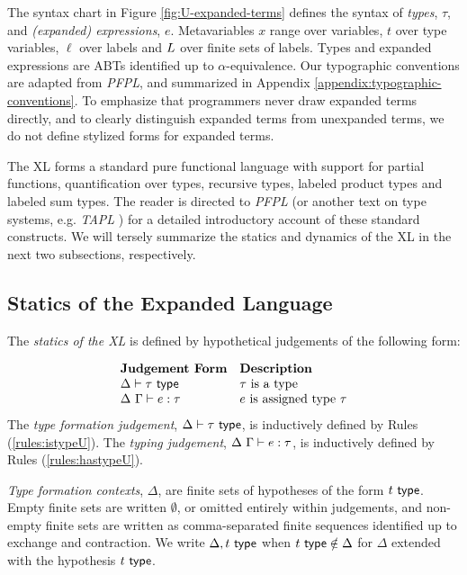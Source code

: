 \noindent The syntax chart in Figure \ref{fig:U-expanded-terms} defines the syntax of \emph{types}, $\tau$, and \emph{(expanded) expressions}, $e$. Metavariables $x$ range over variables, $t$ over type variables, $\ell$ over labels and $L$ over finite sets of labels. Types and expanded expressions are ABTs identified up to $\alpha$-equivalence. Our typographic conventions are adapted from \emph{PFPL}, and summarized in Appendix \ref{appendix:typographic-conventions}. To emphasize that programmers never draw expanded terms directly, and to clearly distinguish expanded terms from unexpanded terms, we do not define stylized forms for expanded terms.

The {XL} forms a standard pure functional language with support for partial functions, quantification over types, recursive types, labeled product types and labeled sum types.  The reader is directed to \emph{PFPL} \cite{pfpl} (or another text on type systems, e.g. \emph{TAPL} \cite{tapl}) for a detailed introductory account of these standard constructs. We will tersely summarize the statics and dynamics of the XL in the next two subsections, respectively.


\subsection{Statics of the Expanded Language}
The \emph{statics of the XL} is defined by hypothetical judgements of the following form:

\[\begin{array}{ll}
\textbf{Judgement Form} & \textbf{Description}\\
\Delta \vdash \tau~\mathsf{type} & \text{$\tau$ is a type}\\
\Delta~\Gamma \vdash e : \tau & \text{$e$ is assigned type $\tau$}
\end{array}\]
The \emph{type formation judgement}, $\Delta \vdash \tau~\mathsf{type}$, is inductively defined by Rules (\ref{rules:istypeU}). The \emph{typing judgement}, $\Delta~\Gamma \vdash e : \tau$, is inductively defined by Rules (\ref{rules:hastypeU}).

\emph{Type formation contexts}, $\Delta$, are finite sets of hypotheses of the form $t~\mathsf{type}$. Empty finite sets are written $\emptyset$, or omitted entirely within judgements, and non-empty finite sets are written as comma-separated finite sequences identified up to exchange and contraction. We write $\Delta, t~\mathsf{type}$ when $t~\mathsf{type} \notin \Delta$ for $\Delta$ extended with the hypothesis $t~\mathsf{type}$. %

